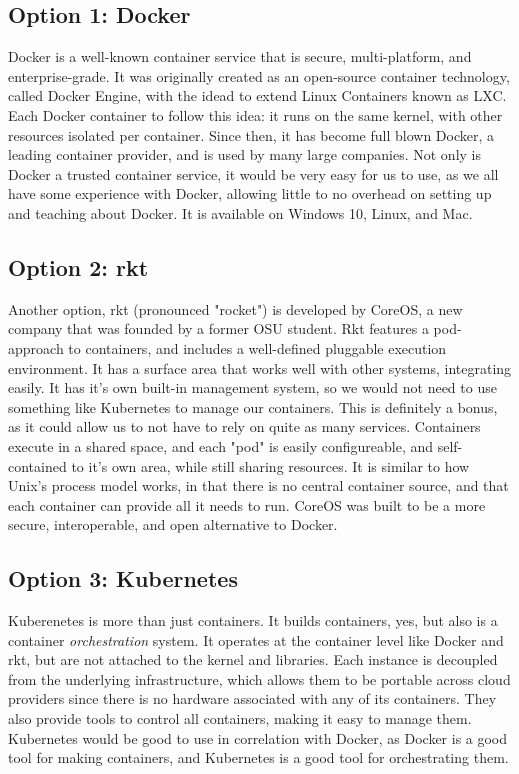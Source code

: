 \documentclass[10pt, draftclsnofoot, journal, onecolumn]{IEEEtran}
\begin{document}
    \subsection{Option 1: Docker}
        Docker is a well-known container service that is secure, multi-platform, and enterprise-grade. It was originally created as an open-source container technology, called Docker Engine, with the idead to extend Linux Containers known as LXC.\cite{DockerEng} Each Docker container to follow this idea: it runs on the same kernel, with other resources isolated per container.
        Since then, it has become full blown Docker, a leading container provider, and is used by many large companies. \cite{DockerCust} Not only is Docker a trusted container service, it would be very easy for us to use, as we all have some experience with Docker, allowing little to no overhead on setting up and teaching about Docker. It is available on Windows 10, Linux, and Mac. 
        
        
    \subsection{Option 2: rkt}
        Another option, rkt (pronounced "rocket") is developed by CoreOS, a new company that was founded by a former OSU student. 
        Rkt features a pod-approach to containers, and includes a well-defined pluggable execution environment. 
        It has a surface area that works well with other systems, integrating easily.
        It has it's own built-in management system, so we would not need to use something like Kubernetes to manage our containers. This is definitely a bonus, as it could allow us to not have to rely on quite as many services. Containers execute in a shared space, and each "pod" is easily configureable, and self-contained to it's own area, while still sharing resources. It is similar to how Unix's process model works, in that there is no central container source, and that each container can provide all it needs to run. CoreOS was built to be a more secure, interoperable, and open alternative to Docker. \cite{rktvsdock} 
        
        
        \subsection{Option 3: Kubernetes}
        Kuberenetes is more than just containers. It builds containers, yes, but also is a container \textit{orchestration} system.
        It operates at the container level like Docker and rkt, but are not attached to the kernel and libraries. Each instance is decoupled from the underlying infrastructure, which allows them to be portable across cloud providers since there is no hardware associated with any of its containers. They also provide tools to control all containers, making it easy to manage them. \cite{kubernetes} Kubernetes would be good to use in correlation with Docker, as Docker is a good tool for making containers, and Kubernetes is a good tool for orchestrating them.
        
\end{document}
